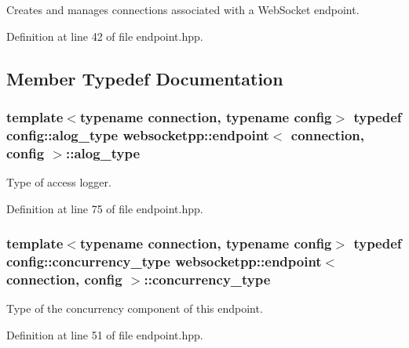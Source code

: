 Creates and manages connections associated with a Web\+Socket endpoint. 

Definition at line 42 of file endpoint.\+hpp.



\subsection{Member Typedef Documentation}
\hypertarget{classwebsocketpp_1_1endpoint_a1ca2ad5bfdd241a031746c3f158f4003}{}
\subsubsection[{alog\+\_\+type}]{\setlength{\rightskip}{0pt plus 5cm}template$<$typename connection, typename config$>$ typedef config\+::alog\+\_\+type {\bf websocketpp\+::endpoint}$<$ {\bf connection}, config $>$\+::{\bf alog\+\_\+type}}\label{classwebsocketpp_1_1endpoint_a1ca2ad5bfdd241a031746c3f158f4003}


Type of access logger. 



Definition at line 75 of file endpoint.\+hpp.

\hypertarget{classwebsocketpp_1_1endpoint_a16950dc8da6e73c4aeb47f7755b63101}{}
\subsubsection[{concurrency\+\_\+type}]{\setlength{\rightskip}{0pt plus 5cm}template$<$typename connection, typename config$>$ typedef config\+::concurrency\+\_\+type {\bf websocketpp\+::endpoint}$<$ {\bf connection}, config $>$\+::{\bf concurrency\+\_\+type}}\label{classwebsocketpp_1_1endpoint_a16950dc8da6e73c4aeb47f7755b63101}


Type of the concurrency component of this endpoint. 



Definition at line 51 of file endpoint.\+hpp.

\hypertarget{classwebsocketpp_1_1endpoint_aa90d289d870c500be228ee1dea75b8b2}{}
